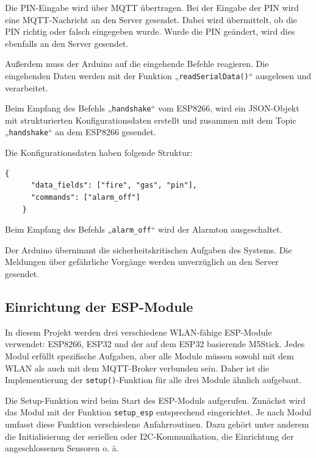 \documentclass[12pt, letterpaper]{article}
\begin{document}
  \par Die PIN-Eingabe wird über MQTT übertragen. Bei der Eingabe der PIN wird eine MQTT-Nachricht an den Server gesendet. Dabei wird übermittelt, ob die PIN richtig oder falsch eingegeben wurde. Wurde die PIN geändert, wird dies ebenfalls an den Server gesendet.
  \par Außerdem muss der Arduino auf die eingehende Befehle reagieren. Die eingehenden Daten werden mit der Funktion „\texttt{readSerialData()}“ ausgelesen und verarbeitet.
  \par Beim Empfang des Befehls „\texttt{handshake}“ vom ESP8266, wird ein JSON-Objekt mit strukturierten Konfigurationsdaten erstellt und zusammen mit dem Topic „\texttt{handshake}“ an dem ESP8266 gesendet.
  \par Die Konfigurationsdaten haben folgende Struktur:
  \begin{Verbatim}[frame=single]
    {
      "data_fields": ["fire", "gas", "pin"],
      "commands": ["alarm_off"]
    }
  \end{Verbatim}
  \par Beim Empfang des Befehls „\texttt{alarm\_off}“ wird der Alarmton ausgeschaltet.
  \par Der Arduino übernimmt die sicherheitskritischen Aufgaben des Systems. Die Meldungen über gefährliche Vorgänge werden unverzüglich an den Server gesendet. 
  
  \subsection{Einrichtung der ESP-Module}
  \par In diesem Projekt werden drei verschiedene WLAN-fähige ESP-Module verwendet: ESP8266, ESP32 und der auf dem ESP32 basierende M5Stick. Jedes Modul erfüllt spezifische Aufgaben, aber alle Module müssen sowohl mit dem WLAN als auch mit dem MQTT-Broker verbunden sein. Daher ist die Implementierung der \texttt{setup()}-Funktion für alle drei Module ähnlich aufgebaut.
  \par Die Setup-Funktion wird beim Start des ESP-Moduls aufgerufen. Zunächst wird das Modul mit der Funktion \texttt{setup\_esp} entsprechend eingerichtet. Je nach Modul umfasst diese Funktion verschiedene Anfahrroutinen. Dazu gehört unter anderem die Initialisierung der seriellen oder I2C-Kommunikation, die Einrichtung der angeschlossenen Sensoren o. ä. 
\end{document}
